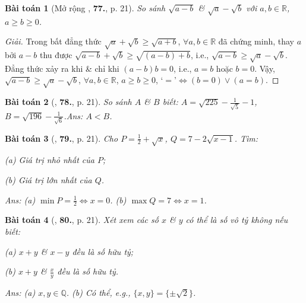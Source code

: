 \documentclass{article}
\numberwithin{equation}{section}
\newtheorem{baitoan}{Bài toán}
\begin{document}
\begin{baitoan}[Mở rộng \cite{Tuyen_Toan_7}, \textbf{77.}, p. 21]
	So sánh $\sqrt{a - b}$ \& $\sqrt{a} - \sqrt{b}$ với $a,b\in\mathbb{R}$, $a\ge b\ge 0$.
\end{baitoan}

\begin{proof}[Giải]
	Trong bất đẳng thức $\sqrt{a} + \sqrt{b}\ge\sqrt{a + b}$, $\forall a,b\in\mathbb{R}$ đã chứng minh, thay $a$ bởi $a - b$ thu được $\sqrt{a - b} + \sqrt{b}\ge\sqrt{(a - b) + b}$, i.e., $\sqrt{a - b}\ge\sqrt{a} - \sqrt{b}$. Đẳng thức xảy ra khi \& chỉ khi $(a - b)b = 0$, i.e., $a = b$ hoặc $b = 0$. Vậy, $\sqrt{a - b}\ge\sqrt{a} - \sqrt{b}$, $\forall a,b\in\mathbb{R}$, $a\ge b\ge 0$, `$=$'$\Leftrightarrow(b = 0)\lor(a = b)$.
\end{proof}

\begin{baitoan}[\cite{Tuyen_Toan_7}, \textbf{78.}, p. 21]
	So sánh $A$ \& $B$ biết: $A = \sqrt{225} - \frac{1}{\sqrt{5}} - 1$, $B = \sqrt{196} - \frac{1}{\sqrt{6}}$.\hfill{\sf Ans:} $A < B$.
\end{baitoan}

\begin{baitoan}[\cite{Tuyen_Toan_7}, \textbf{79.}, p. 21]
	Cho $P = \frac{1}{2} + \sqrt{x}$, $Q = 7 - 2\sqrt{x - 1}$. Tìm:
	\begin{enumerate*}
		\item[(a)] Giá trị nhỏ nhất của $P$;
		\item[(b)] Giá trị lớn nhất của $Q$.
	\end{enumerate*}\hfill{\sf Ans:} (a) $\min P = \frac{1}{2}\Leftrightarrow x = 0$. (b) $\max Q = 7\Leftrightarrow x = 1$.
\end{baitoan}

\begin{baitoan}[\cite{Tuyen_Toan_7}, \textbf{80.}, p. 21]
	Xét xem các số $x$ \& $y$ có thể là số vô tỷ không nếu biết:
	\begin{enumerate*}
		\item[(a)] $x + y$ \& $x - y$ đều là số hữu tỷ;
		\item[(b)] $x + y$ \& $\frac{x}{y}$ đều là số hữu tỷ.
	\end{enumerate*}\hfill{\sf Ans:} (a) $x,y\in\mathbb{Q}$. (b) Có thể, e.g., $\{x,y\} = \{\pm\sqrt{2}\}$.
\end{baitoan}

\end{document}
